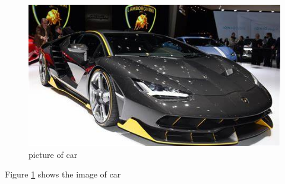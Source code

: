 \documentclass{article}
\begin{document}
	\begin{figure}
		\includegraphics[width=\linewidth]{car.jpg}
		\caption{picture of car}
		\label{fig:car image}
	\end{figure}
	Figure \ref{fig:car image} shows the image of car
\end{document}
